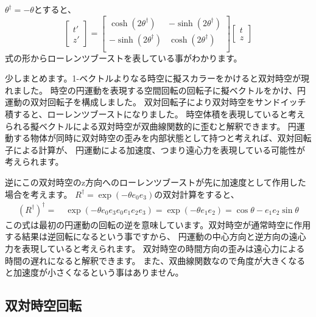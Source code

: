 \documentclass[a4paper,12pt,notitlepage]{jsreport}
\begin{document}
$\theta^\dag=-\theta$とすると、
\begin{equation}
  \begin{bmatrix}
    t'\\z'
  \end{bmatrix}
  =
  \begin{bmatrix}
    \cosh(2\theta^\dag) & -\sinh(2\theta^\dag) \\
    -\sinh(2\theta^\dag) & \cosh(2\theta^\dag) \\
  \end{bmatrix}
  \begin{bmatrix}
    t\\z
  \end{bmatrix}
\end{equation}
式の形からローレンツブーストを表している事がわかります。

少しまとめます。1-ベクトルよりなる時空に擬スカラーをかけると双対時空が現れました。
時空の円運動を表現する空間回転の回転子に擬ベクトルをかけ、円運動の双対回転子を構成しました。
双対回転子により双対時空をサンドイッチ積すると、ローレンツブーストになりました。
時空体積を表現していると考えられる擬ベクトルによる双対時空が双曲線関数的に歪むと解釈できます。
円運動する物体が同時に双対時空の歪みを内部状態として持つと考えれば、双対回転子による計算が、
円運動による加速度、つまり遠心力を表現している可能性が考えられます。

逆にこの双対時空のz方向へのローレンツブーストが先に加速度として作用した場合を考えます。
$R^\dag=\exp(-\theta e_0e_3)$の双対計算をすると、
\begin{equation}
  \begin{split}
    (R^\dag)^\dag=~&\exp(-\theta e_0e_3e_0e_1e_2e_3)=\exp(-\theta e_1e_2)=\cos\theta-e_1e_2\sin\theta
  \end{split}
\end{equation}
この式は最初の円運動の回転の逆を意味しています。双対時空が通常時空に作用する結果は逆回転になるという事ですから、
円運動の中心方向と逆方向の遠心力を表現していると考えられます。
双対時空の時間方向の歪みは遠心力による時間の遅れになると解釈できます。
また、双曲線関数なので角度が大きくなると加速度が小さくなるという事はありません。

\subsection{双対時空回転}
\end{document}
